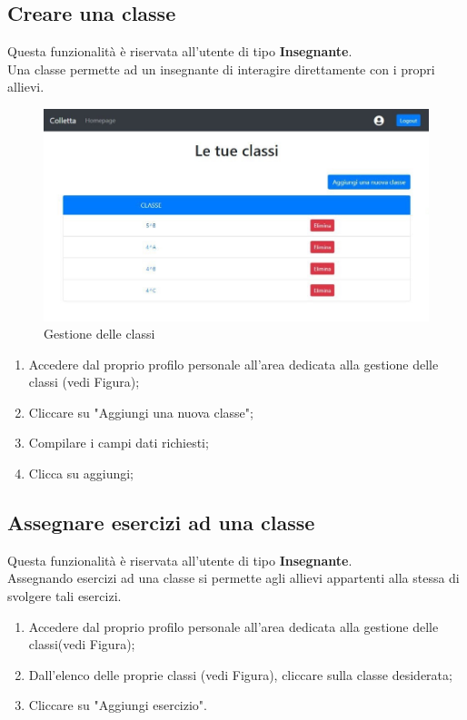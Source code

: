 \documentclass[11pt,a4paper]{article}
\begin{document}
{	\subsection{Creare una classe}
			Questa funzionalità è riservata all'utente di tipo \textbf{Insegnante}.\\
			Una classe permette ad un insegnante di interagire direttamente con i propri allievi.
				\begin{figure}[h!]
				\centering
				\includegraphics[scale=0.65]{images/classi.jpg}
				\caption{Gestione delle classi}
			\end{figure}
					\begin{enumerate}
			\item Accedere dal proprio profilo personale all'area dedicata alla gestione delle classi (vedi Figura);
			\item Cliccare su "Aggiungi una nuova classe";
			\item Compilare i campi dati richiesti;
			\item Clicca su aggiungi;
		\end{enumerate}
	\subsection{Assegnare esercizi ad una classe}
			Questa funzionalità è riservata all'utente di tipo \textbf{Insegnante}.\\
			Assegnando esercizi ad una classe si permette agli allievi appartenti alla stessa di svolgere tali esercizi.
			\begin{enumerate}
				\item Accedere dal proprio profilo personale all'area dedicata alla gestione delle classi(vedi Figura);
				\item Dall'elenco delle proprie classi (vedi Figura), cliccare sulla classe desiderata;
				\item Cliccare su "Aggiungi esercizio".
			\end{enumerate}
		
}
\end{document}
